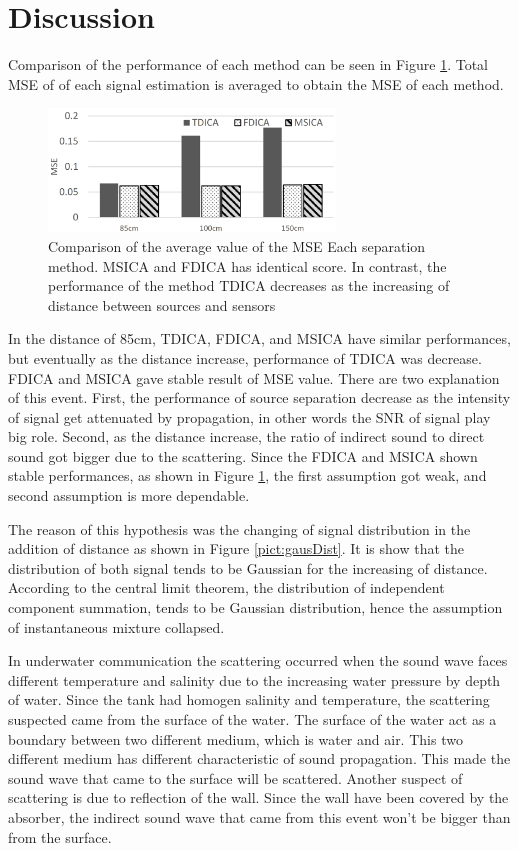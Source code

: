 \documentclass[a4paper]{jpconf}
\begin{document}
\section{Discussion}
Comparison of the performance of each method can be seen in Figure \ref{pict:comparison}. Total MSE of of each signal estimation is averaged to obtain the MSE of each method.

\begin{figure}[h]
\begin{center}
\includegraphics[width=3in]{figure6.png}
\caption{\label{pict:comparison}Comparison of the average value of the MSE Each separation method. MSICA and FDICA has identical score. In contrast, the performance of the method TDICA decreases as the increasing of distance between sources and sensors}
\end{center}
\end{figure}

In the distance of 85cm, TDICA, FDICA, and MSICA have similar performances, but eventually as the distance increase, performance of TDICA was decrease. FDICA and MSICA gave stable result of MSE value. There are two explanation of this event. First, the performance of source separation decrease as the intensity of signal get attenuated by propagation, in other words the SNR of signal play big role. Second, as the distance increase, the ratio of indirect sound to direct sound got bigger due to the scattering. Since the FDICA and MSICA shown stable performances, as shown in Figure \ref{pict:comparison}, the first assumption got weak, and second assumption is more dependable. 

The reason of this hypothesis was the changing of signal distribution in the addition of distance as shown in Figure \ref{pict:gausDist}. It is show that the distribution of both signal tends to be Gaussian for the increasing of distance. According to the central limit theorem, the distribution of independent component summation, tends to be Gaussian distribution, hence the assumption of instantaneous mixture collapsed.

In underwater communication the scattering occurred when the sound wave faces different temperature and salinity due to the increasing water pressure by depth of water. Since the tank had homogen salinity and temperature, the scattering suspected came from the surface of the water. The surface of the water act as a boundary between two different medium, which is water and air. This two different medium has different characteristic of sound propagation. This made the sound wave that came to the surface will be scattered. Another suspect of scattering is due to reflection of the wall. Since the wall have been covered by the absorber, the indirect sound wave that came from this event won’t be bigger than from the surface. 
\end{document}
